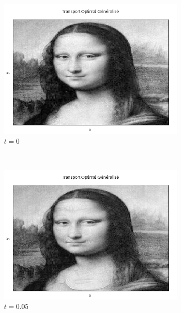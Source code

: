 \documentclass[a4paper,12pt]{article}
\begin{document}
\begin{figure}[!h]
\centering
\begin{subfigure}[b]{0.23\linewidth}
\includegraphics[width=\linewidth]{img/2DMorphing/T_00001.png}
\caption*{$t=0$}
\end{subfigure}
~
\begin{subfigure}[b]{0.23\linewidth}
\includegraphics[width=\linewidth]{img/2DMorphing/T_00012.png}
\caption*{$t=0.05$}
\end{subfigure}
~
\begin{subfigure}[b]{0.23\linewidth}

\end{subfigure}
\end{figure}
\end{document}
